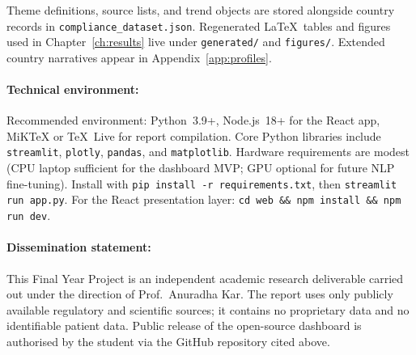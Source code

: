 
Theme definitions, source lists, and trend objects are stored alongside country records in
\texttt{compliance\_dataset.json}. Regenerated \LaTeX\ tables and figures used in
Chapter~\ref{ch:results} live under \texttt{generated/} and \texttt{figures/}.
Extended country narratives appear in Appendix~\ref{app:profiles}.

\paragraph{Technical environment:}
Recommended environment: Python~3.9+, Node.js~18+ for the React app, MiKTeX or TeX~Live
for report compilation. Core Python libraries include \texttt{streamlit}, \texttt{plotly},
\texttt{pandas}, and \texttt{matplotlib}. Hardware requirements are modest (CPU laptop
sufficient for the dashboard MVP; GPU optional for future NLP fine-tuning). Install with
\texttt{pip install -r requirements.txt}, then \texttt{streamlit run app.py}. For the React
presentation layer: \texttt{cd web \&\& npm install \&\& npm run dev}.

\paragraph{Dissemination statement:}
This Final Year Project is an independent academic research deliverable carried out under the
direction of Prof.\ Anuradha Kar. The report uses only publicly available regulatory and
scientific sources; it contains no proprietary data and no identifiable patient data.
Public release of the open-source dashboard is authorised by the student via the GitHub
repository cited above.
